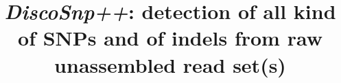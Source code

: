 \documentclass{bmcart}
\begin{document}
\begin{frontmatter}

\begin{fmbox}


\title{{\it DiscoSnp++}: detection of all kind of SNPs and of indels from raw unassembled read set(s)}


\author[
   addressref={aff1},                   %
   corref={aff1},                       %
   email={pierre.peterlongo@inria.fr}   %
]{ }
 \author[
    addressref={aff1},
    email={erwan.drezen@inria.fr}
 ]{ }


\address[id=aff1]{%
  , %
  ,                     %
  ,                              %
}


\end{fmbox}
\end{frontmatter}
\end{document}
